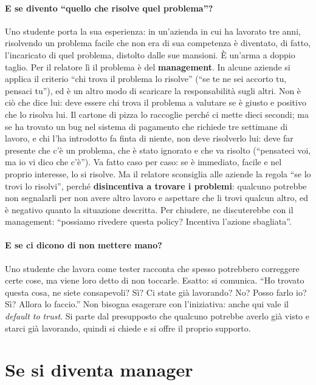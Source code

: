 \paragraph{E se divento ``quello che risolve quel problema''?} Uno studente porta la sua esperienza:
in un'azienda in cui ha lavorato tre anni, risolvendo un problema facile che non era di sua
competenza è diventato, di fatto, l'incaricato di quel problema, distolto dalle sue mansioni. È
un'arma a doppio taglio. Per il relatore lì il problema è del \textbf{management}. In alcune aziende si
applica il criterio ``chi trova il problema lo risolve'' (``se te ne sei accorto tu, pensaci tu''), ed
è un altro modo di scaricare la responsabilità sugli altri. Non è ciò che dice lui: deve essere chi
trova il problema a valutare se è giusto e positivo che lo risolva lui. Il cartone di pizza lo
raccoglie perché ci mette dieci secondi; ma se ha trovato un bug nel sistema di pagamento che richiede
tre settimane di lavoro, e chi l'ha introdotto fa finta di niente, non deve risolverlo lui: deve far
presente che c'è un problema, che è stato ignorato e che va risolto (``pensateci voi, ma io vi dico
che c'è''). Va fatto caso per caso: se è immediato, facile e nel proprio interesse, lo si risolve.
Ma il relatore sconsiglia alle aziende la regola ``se lo trovi lo risolvi'', perché \textbf{disincentiva
a trovare i problemi}: qualcuno potrebbe non segnalarli per non avere altro lavoro e aspettare che li
trovi qualcun altro, ed è negativo quanto la situazione descritta. Per chiudere, ne discuterebbe con il
management: ``possiamo rivedere questa policy? Incentiva l'azione sbagliata''.

\paragraph{E se ci dicono di non mettere mano?} Uno studente che lavora come tester racconta che spesso
potrebbero correggere certe cose, ma viene loro detto di non toccarle. Esatto: si comunica. ``Ho trovato
questa cosa, ne siete consapevoli? Sì? Ci state già lavorando? No? Posso farlo io? Sì? Allora lo
faccio.'' Non bisogna esagerare con l'iniziativa: anche qui vale il \emph{default to trust}. Si parte
dal presupposto che qualcuno potrebbe averlo già visto e starci già lavorando, quindi si chiede e si
offre il proprio supporto.

\section{Se si diventa manager}
\label{sec:z2-manager}

